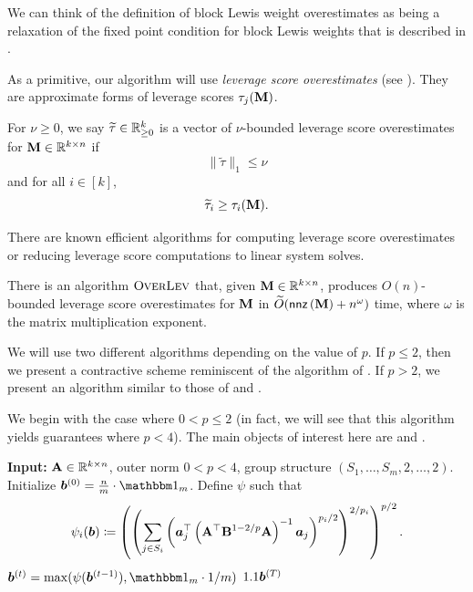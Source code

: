 \documentclass[11pt]{article}
\numberwithin{equation}{section}
\begin{document}
We can think of the definition of block Lewis weight overestimates as being a relaxation of the fixed point condition for block Lewis weights that is described in \cite[Page 31, Proof of Lemma 4.2]{jlls23}. 

As a primitive, our algorithm will use \textit{leverage score overestimates} (see \cite[Definition 2.2]{jls22}). They are approximate forms of leverage scores \(\tau_j(\mathbf{M})\).
\begin{definition}
    For \(\nu \ge 0\), we say \(\widetilde{\tau} \in \mathbb{R}^k_{\ge 0}\) is a vector of \(\nu\)-bounded leverage score overestimates for \(\mathbf{M} \in \mathbb{R}^{k \times n}\) if
    \[\|\widetilde{\tau}\|_1 \le \nu\]
    and for all \(i \in [k]\),
    \[\widetilde{\tau}_i \ge \tau_i(\mathbf{M}).\]
\end{definition}

There are known efficient algorithms for computing leverage score overestimates or reducing leverage score computations to linear system solves.

\begin{theorem}\label{thm:lev_ove}
There is an algorithm \(\textsc{OverLev}\) that, given \(\mathbf{M} \in \mathbb{R}^{k \times n}\), produces \(O(n)\)-bounded leverage score overestimates for \(\mathbf{M}\) in \(\widetilde{O}(\mathsf{nnz}\left(\mathbf{M}\right) + n^\omega)\) time, where \(\omega\) is the matrix multiplication exponent.
\end{theorem}

We will use two different algorithms depending on the value of $p$. If $p \le 2$, then we present a contractive scheme reminiscent of the algorithm of \citet{cp15}. If $p > 2$, we present an algorithm similar to those of \citet{ccly19} and \citet{jls21}.

We begin with the case where $0 < p \le 2$ (in fact, we will see that this algorithm yields guarantees where $p < 4$). The main objects of interest here are  and .

\begin{algorithm}
\caption{Algorithm to compute block Lewis weight overestimates, $0 < p < 4$ and $p_1=\dots=p_m=2$.}
\begin{algorithmic}[1]\label{alg:blw_lewismap}
\State \textbf{Input:} \(\mathbf{A} \in \mathbb{R}^{k \times n}\), outer norm $0 < p < 4$, group structure \((S_1,\dots,S_m,2,\dots,2)\).
\State Initialize \(\vb^{(0)} = \frac{n}{m} \cdot \onev_m\).
\State Define $\psi$ such that\label{line:psi_def}
\begin{align*}
    \psi_i(\bm{b}) \coloneqq \left(\left(\sum_{j \in S_i} \left(\bm{a}_j^{\top}\left(\mathbf{A}^{\top}\mathbf{B}^{1-2/p}\mathbf{A}\right)^{-1}\bm{a}_j\right)^{p_i/2}\right)^{2/p_i}\right)^{p/2}.
\end{align*}
    \State \(\vb^{(t)} = \max(\psi(\vb^{(t-1)}),\onev_{m} \cdot 1/m)\) 
\EndFor
\State \Return \(1.1\bm{b}^{(T)}\)
\end{algorithmic}
\end{algorithm}
\end{document}
